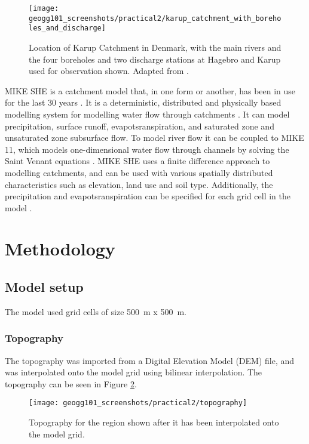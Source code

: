 \documentclass{article}
\begin{document}
\begin{figure}[!h]
    \centering
    \texttt{[image: geogg101\_screenshots/practical2/karup\_catchment\_with\_boreholes\_and\_discharge]}
    \caption{Location of Karup Catchment in Denmark, with the main rivers and the four boreholes and two discharge stations at Hagebro and Karup used for observation shown. Adapted from \textcite{blasone2008uncertainty}.}
    \label{fig:karup_catchment}
\end{figure}

MIKE SHE is a catchment model that, in one form or another, has been in use for the last 30 years \parencite{refsgaard2010systeme}. It is a deterministic, distributed and physically based modelling system for modelling water flow through catchments \parencite{refsgaard1995mike}. It can model precipitation, surface runoff, evapotsranspiration, and saturated zone and unsaturated zone subsurface flow. To model river flow it can be coupled to MIKE 11, which models one-dimensional water flow through channels by solving the Saint Venant equations \parencite{havno1995mike}.  
MIKE SHE uses a finite difference approach to modelling catchments, and can be used with various spatially distributed characteristics such as elevation, land use and soil type. Additionally, the precipitation and evapotsranspiration can be specified for each grid cell in the model \parencite{thompson2012modelling}.

\newpage
\section{Methodology}

\subsection{Model setup}

The model used grid cells of size \SI{500}{m} x \SI{500}{m}.

\subsubsection{Topography}

The topography was imported from a Digital Elevation Model (DEM) file, and was interpolated onto the model grid using bilinear interpolation. The topography can be seen in Figure \ref{fig:topography}.

\begin{figure}[!h]
    \centering
    \texttt{[image: geogg101\_screenshots/practical2/topography]}
    \caption{Topography for the region shown after it has been interpolated onto the model grid.}
    \label{fig:topography}
\end{figure}
\end{document}
